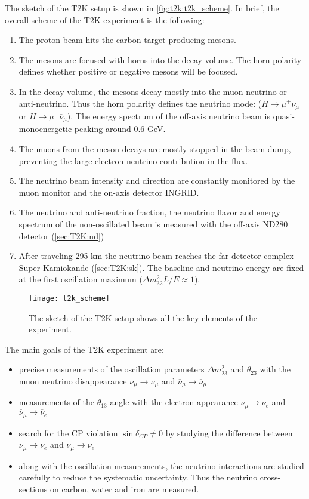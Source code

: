 \documentclass[../main.tex]{subfiles}
\begin{document}
The sketch of the T2K setup is shown in \autoref{fig:t2k:t2k_scheme}. In brief, the overall scheme of the T2K experiment is the following:
\begin{enumerate}
  \item The proton beam hits the carbon target producing mesons.
  \item The mesons are focused with horns into the decay volume. The horn polarity defines whether positive or negative mesons will be focused.
  \item In the decay volume, the mesons decay mostly into the muon neutrino or anti-neutrino. Thus the horn polarity defines the neutrino mode: ($H\to\mu^+\nu_{\mu}$ or $\overline{H}\to\mu^-\overline{\nu}_{\mu}$). The energy spectrum of the off-axis neutrino beam is quasi-monoenergetic peaking around 0.6 GeV.
  \item The muons from the meson decays are mostly stopped in the beam dump, preventing the large electron neutrino contribution in the flux.
  \item The neutrino beam intensity and direction are constantly monitored by the muon monitor and the on-axis detector INGRID.
  \item The neutrino and anti-neutrino fraction, the neutrino flavor and energy spectrum of the non-oscillated beam is measured with the off-axis ND280 detector (\autoref{sec:T2K:nd})
  \item After traveling 295 km the neutrino beam reaches the far detector complex Super-Kamiokande (\autoref{sec:T2K:sk}). The baseline and neutrino energy are fixed at the first oscillation maximum ($\Delta m ^2_{32}L/E\approx1$).
\end{enumerate}

\begin{figure}[!ht]
  \centering
  \texttt{[image: t2k\_scheme]}
  \caption{The sketch of the T2K setup shows all the key elements of the experiment.}
  \label{fig:t2k:t2k_scheme}
\end{figure}

The main goals of the T2K experiment are:
\begin{itemize}
  \item precise measurements of the oscillation parameters $\Delta m^2_{23}$ and $\theta_{23}$ with the muon neutrino disappearance $\nu_\mu\to\nu_\mu$ and $\overline{\nu}_\mu\to\overline{\nu}_\mu$
  \item measurements of the  $\theta_{13}$ angle with the electron appearance $\nu_\mu\to\nu_e$ and $\overline{\nu}_\mu\to\overline{\nu}_e$
  \item search for the CP violation $\sin\delta_{CP}\neq0$ by studying the difference between $\nu_\mu\to\nu_e$ and $\overline{\nu}_\mu\to\overline{\nu}_e$
  \item along with the oscillation measurements, the neutrino interactions are studied carefully to reduce the systematic uncertainty. Thus the neutrino cross-sections on carbon, water and iron are measured.
\end{itemize}
\end{document}
